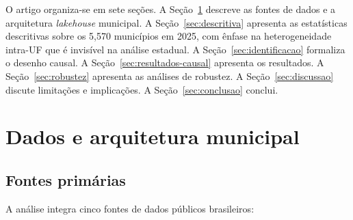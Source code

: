 \documentclass[12pt,a4paper,oneside]{article}
\begin{document}
O artigo organiza-se em sete seções. A Seção~\ref{sec:dados} descreve
as fontes de dados e a arquitetura \textit{lakehouse} municipal.
A Seção~\ref{sec:descritiva} apresenta as estatísticas descritivas
sobre os 5{,}570 municípios em 2025, com ênfase na heterogeneidade
intra-UF que é invisível na análise estadual. A
Seção~\ref{sec:identificacao} formaliza o desenho causal. A
Seção~\ref{sec:resultados-causal} apresenta os resultados. A
Seção~\ref{sec:robustez} apresenta as análises de robustez. A
Seção~\ref{sec:discussao} discute limitações e implicações. A
Seção~\ref{sec:conclusao} conclui.

\section{Dados e arquitetura municipal}\label{sec:dados}

\subsection{Fontes primárias}

A análise integra cinco fontes de dados públicos brasileiros:
\end{document}
